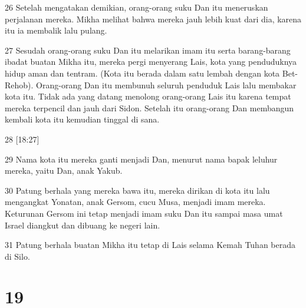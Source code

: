 \par 26 Setelah mengatakan demikian, orang-orang suku Dan itu meneruskan perjalanan mereka. Mikha melihat bahwa mereka jauh lebih kuat dari dia, karena itu ia membalik lalu pulang.
\par 27 Sesudah orang-orang suku Dan itu melarikan imam itu serta barang-barang ibadat buatan Mikha itu, mereka pergi menyerang Lais, kota yang penduduknya hidup aman dan tentram. (Kota itu berada dalam satu lembah dengan kota Bet-Rehob). Orang-orang Dan itu membunuh seluruh penduduk Lais lalu membakar kota itu. Tidak ada yang datang menolong orang-orang Lais itu karena tempat mereka terpencil dan jauh dari Sidon. Setelah itu orang-orang Dan membangun kembali kota itu kemudian tinggal di sana.
\par 28 [18:27]
\par 29 Nama kota itu mereka ganti menjadi Dan, menurut nama bapak leluhur mereka, yaitu Dan, anak Yakub.
\par 30 Patung berhala yang mereka bawa itu, mereka dirikan di kota itu lalu mengangkat Yonatan, anak Gersom, cucu Musa, menjadi imam mereka. Keturunan Gersom ini tetap menjadi imam suku Dan itu sampai masa umat Israel diangkut dan dibuang ke negeri lain.
\par 31 Patung berhala buatan Mikha itu tetap di Lais selama Kemah Tuhan berada di Silo.

\chapter{19}

